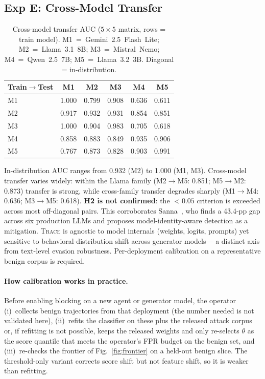 \documentclass[conference]{IEEEtran}
\begin{document}
\subsection{Exp E: Cross-Model Transfer}
\label{sec:exp_e}

\begin{table}[t]
\centering
\caption{Cross-model transfer AUC ($5{\times}5$ matrix, rows = train model).
  M1~=~Gemini~2.5~Flash~Lite; M2~=~Llama~3.1~8B; M3~=~Mistral~Nemo;
  M4~=~Qwen~2.5~7B; M5~=~Llama~3.2~3B.  Diagonal = in-distribution.}
\label{tab:transfer}
\begin{tabular}{lccccc}
\toprule
Train$\!\to$Test & M1 & M2 & M3 & M4 & M5 \\
\midrule
M1 & 1.000 & 0.799 & 0.908 & 0.636 & 0.611 \\
M2 & 0.917 & 0.932 & 0.931 & 0.854 & 0.851 \\
M3 & 1.000 & 0.904 & 0.983 & 0.705 & 0.618 \\
M4 & 0.858 & 0.883 & 0.849 & 0.935 & 0.906 \\
M5 & 0.767 & 0.873 & 0.828 & 0.903 & 0.991 \\
\bottomrule
\end{tabular}
\end{table}

In-distribution AUC ranges from 0.932 (M2) to 1.000 (M1, M3).
Cross-model transfer varies widely: within the Llama family
(M2$\to$M5: 0.851; M5$\to$M2: 0.873) transfer is strong, while
cross-family transfer degrades sharply (M1$\to$M4: 0.636;
M3$\to$M5: 0.618).  \textbf{H2 is not confirmed}: the $<0.05$
criterion is exceeded across most off-diagonal pairs.
This corroborates Sanna~\cite{sanna2025crossllm},
who finds a 43.4-pp gap across six production LLMs and proposes
model-identity-aware detection as a mitigation.
\textsc{Trace} is agnostic to model internals (weights, logits, prompts)
yet sensitive to behavioral-distribution shift across generator models---
a distinct axis from text-level evasion robustness.
Per-deployment calibration on a representative benign corpus is required.

\paragraph{How calibration works in practice.}
Before enabling blocking on a new agent or generator model, the operator
(i)~collects benign trajectories from that deployment (the number
needed is not validated here), (ii)~refits the classifier on these plus
the released attack corpus or, if refitting is not possible, keeps the
released weights and only re-selects $\theta$ as the score quantile
that meets the operator's FPR budget on the benign set, and
(iii)~re-checks the frontier of Fig.~\ref{fig:frontier} on a held-out
benign slice.  The threshold-only variant corrects score shift but not
feature shift, so it is weaker than refitting.
\end{document}
